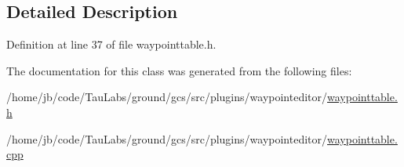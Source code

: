 \subsection{\-Detailed \-Description}


\-Definition at line 37 of file waypointtable.\-h.



\-The documentation for this class was generated from the following files\-:\begin{DoxyCompactItemize}
\item 
/home/jb/code/\-Tau\-Labs/ground/gcs/src/plugins/waypointeditor/\hyperlink{waypointtable_8h}{waypointtable.\-h}\item 
/home/jb/code/\-Tau\-Labs/ground/gcs/src/plugins/waypointeditor/\hyperlink{waypointtable_8cpp}{waypointtable.\-cpp}\end{DoxyCompactItemize}
